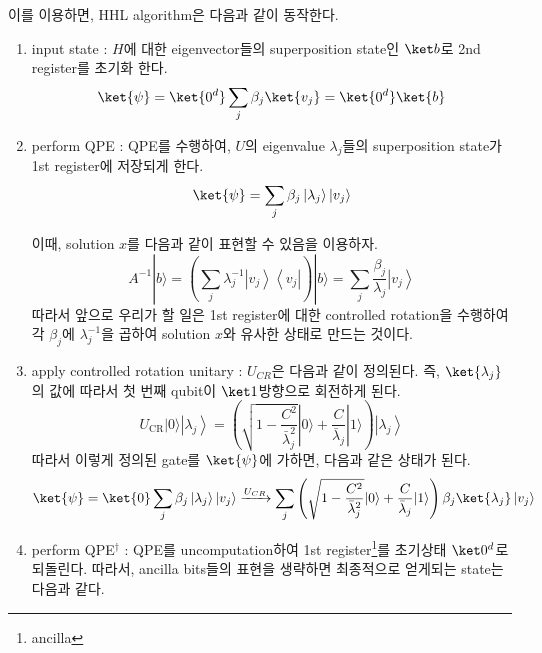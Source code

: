 \newpage
이를 이용하면, HHL algorithm은 다음과 같이 동작한다. 
\begin{enumerate}
  \item input state : $H$에 대한 eigenvector들의 superposition state인 $\ket b$로 2nd register를 초기화 한다. 
  \begin{equation*}
    \ket{\psi} = \ket{0^d} \sum_{j} \beta_j \ket{v_j}  = \ket{0^d}\ket{b}
  \end{equation*}
  \item perform QPE : QPE를 수행하여, $U$의 eigenvalue $\lambda_j$들의 superposition state가 1st register에 저장되게 한다.
  \begin{equation*}
    \ket{\psi} = \sum_j \beta_j\left|\lambda_j\right\rangle\left|v_j\right\rangle
  \end{equation*}
  \begin{note}[Idea]
    이때, solution $x$를 다음과 같이 표현할 수 있음을 이용하자.
    $$ A^{-1}|b\rangle=\left(\sum_j \lambda_j^{-1}\left|v_j\right\rangle\left\langle v_j\right|\right)|b\rangle=\sum_j \frac{\beta_j}{\lambda_j}\left|v_j\right\rangle $$
    따라서 앞으로 우리가 할 일은 1st register에 대한 controlled rotation을 수행하여 각 $\beta_j$에 $\lambda_j^{-1}$을 곱하여 solution $x$와 유사한 상태로 만드는 것이다.
  \end{note} 
  \item apply controlled rotation unitary : $U_{CR}$은 다음과 같이 정의된다. 즉, $\ket{\lambda_j}$의 값에 따라서 첫 번째 qubit이 $\ket 1$방향으로 회전하게 된다.
  \begin{equation*}
    U_{\mathrm{CR}}|0\rangle\left|\lambda_j\right\rangle=\left(\sqrt{1-\frac{C^2}{\bar{\lambda}_j^2}}|0\rangle+\frac{C}{\bar{\lambda}_j}|1\rangle\right)\left|\lambda_j\right\rangle
  \end{equation*}
  따라서 이렇게 정의된 gate를 $\ket{\psi}$에 가하면, 다음과 같은 상태가 된다. 
  \begin{equation*}
    \ket{\psi} = \ket{0} \sum_j \beta_j\left|\lambda_j\right\rangle\left|v_j\right\rangle \xrightarrow{U_{CR}} \sum_j\left(\sqrt{1-\frac{C^2}{\bar{\lambda}_j^2}}|0\rangle+\frac{C}{\bar{\lambda}_j}|1\rangle\right) \beta_j \ket{\lambda_j} \left|v_j\right\rangle 
  \end{equation*}
  \item perform QPE$^\dagger$ : QPE를 uncomputation하여 1st register\footnote{ancilla}를 초기상태 $\ket 0^d$로 되돌린다. 따라서, ancilla bits들의 표현을 생략하면 최종적으로 얻게되는 state는 다음과 같다. 
  \begin{equation*}

\end{equation*}
\end{enumerate}
